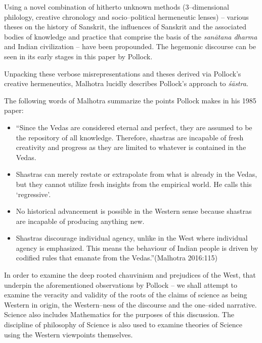 Using a novel combination of hitherto unknown methods (3–dimen\-sion\-al philology, creative chronology and socio–political hermeneutic lenses) – various theses on the history of Sanskrit, the influences of Sanskrit and the associated bodies of knowledge and practice that comprise the basis of the \textit{sanātana dharma} and Indian civilization – have been propounded. The hegemonic discourse can be seen in its early stages in this paper by Pollock.

Unpacking these verbose misrepresentations and theses derived via Pollock’s creative hermeneutics, Malhotra lucidly describes Pollock’s approach to \textit{śāstra}.

The following words of Malhotra summarize the points Pollock makes in his 1985 paper:

\begin{itemize}
\item “Since the Vedas are considered eternal and perfect, they are assumed to be the repository of all knowledge. Therefore, shastras are incapable of fresh creativity and progress as they are limited to whatever is contained in the Vedas.

 \item Shastras can merely restate or extrapolate from what is already in the Vedas, but they cannot utilize fresh insights from the empirical world. He calls this ‘regressive’.

 \item No historical advancement is possible in the Western sense because shastras are incapable of producing anything new.

 \item Shastras discourage individual agency, unlike in the West where individual agency is emphasized. This means the behaviour of Indian people is driven by codified rules that emanate from the Vedas.”\hfill (Malhotra 2016:115)

\end{itemize}

In order to examine the deep rooted chauvinism and prejudices of the West, that underpin the aforementioned observations by Pollock – we shall attempt to examine the veracity and validity of the roots of the claims of science as being Western in origin, the Western–ness of the discourse and the one–sided narrative. Science also includes Mathematics for the purposes of this discussion. The discipline of philosophy of Science is also used to examine theories of Science using the Western viewpoints themselves.


